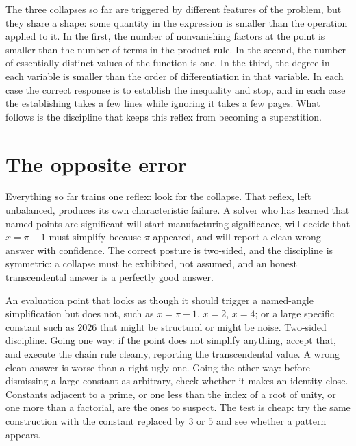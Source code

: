 The three collapses so far are triggered by different features of the problem, but they share a shape: some quantity in the expression is smaller than the operation applied to it. In the first, the number of nonvanishing factors at the point is smaller than the number of terms in the product rule. In the second, the number of essentially distinct values of the function is one. In the third, the degree in each variable is smaller than the order of differentiation in that variable. In each case the correct response is to establish the inequality and stop, and in each case the establishing takes a few lines while ignoring it takes a few pages. What follows is the discipline that keeps this reflex from becoming a superstition.

\section{The opposite error}

Everything so far trains one reflex: look for the collapse. That reflex, left unbalanced, produces its own characteristic failure. A solver who has learned that named points are significant will start manufacturing significance, will decide that $x=\pi-1$ must simplify because $\pi$ appeared, and will report a clean wrong answer with confidence. The correct posture is two-sided, and the discipline is symmetric: a collapse must be exhibited, not assumed, and an honest transcendental answer is a perfectly good answer.

\cue An evaluation point that looks as though it should trigger a named-angle simplification but does not, such as $x=\pi-1$, $x=2$, $x=4$; or a large specific constant such as $2026$ that might be structural or might be noise.
\method Two-sided discipline. Going one way: if the point does not simplify anything, accept that, and execute the chain rule cleanly, reporting the transcendental value. A wrong clean answer is worse than a right ugly one. Going the other way: before dismissing a large constant as arbitrary, check whether it makes an identity close. Constants adjacent to a prime, or one less than the index of a root of unity, or one more than a factorial, are the ones to suspect. The test is cheap: try the same construction with the constant replaced by $3$ or $5$ and see whether a pattern appears.

